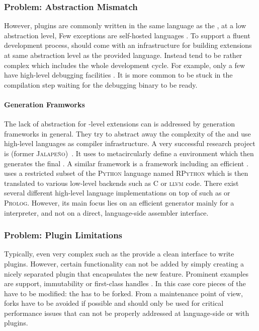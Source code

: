 \subsubsection*{Problem: Abstraction Mismatch}
However, plugins are commonly written in the same language as the \VM, at a low abstraction level,
Few exceptions are self-hosted languages \cite{Unga05a,Wimm13a,Rigo06a}.
To support a fluent development process, \VMs should come with an infrastructure for building extensions at same abstraction level as the provided language.
Instead \VMs tend to be rather complex which includes the whole development cycle.
For example, only a few \VMs have high-level debugging facilities \cite{Inga97a,Unga05a,Wimm13a}.
It is more common to be stuck in the compilation step waiting for the debugging binary to be ready.

\paragraph{\VM Generation Framworks}
The lack of abstraction for \VM-level extensions can is addressed by \VM generation frameworks in general.
They try to abstract away the complexity of the \VM and use high-level languages as compiler infrastructure.
A very successful research project is  (former \textsc{Jalapeño})~\cite{Alpe99a}.
It uses \Java to metacircularly define a \Java environment which then generates the final \VM.
A similar framework is  \cite{Rigo06a} a \VM framework including an efficient \JIT. 
\PyPy uses a restricted subset of the  \textsc{Python} language named \textsc{RPython} which is then translated to various low-level backends such as C or \textsc{llvm} code.
There exist several different high-level language \VM implementations on top of \PyPy such as \ST \cite{Bolz08a} or \textsc{Prolog}.
However, its main focus lies on an efficient \JIT generator mainly for a \Python interpreter, and not on a direct, language-side assembler interface.


\subsubsection*{Problem: Plugin Limitations}
Typically, even very complex \VMs such as the \Self \VM \cite{Unga07a} provide a clean interface to write plugins.
However, certain functionality can not be added by simply creating a nicely separated plugin that encapsulates the new feature.
Prominent examples are \JIT support, immutability or first-class handles \cite{Arna13a}.
In this case core pieces of the \VM have to be modified: the \VM has to be forked.
From a \VM maintenance point of view, forks have to be avoided if possible and should only be used for critical performance issues that can not be properly addressed at language-side or with plugins.

